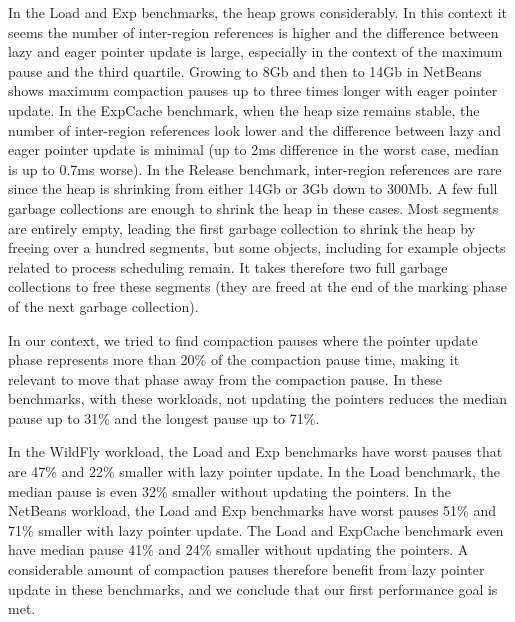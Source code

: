 \documentclass[sigplan,10pt,screen]{acmart}\settopmatter{printfolios=true,printccs=true,printacmref=true}
\newcommand{\egb}[1]{\color{blue}\fbox{\bfseries\sffamily\scriptsize Elisa:}{\sf\small$\blacktriangleright$\textit{#1}$\blacktriangleleft$}\color{black}}
\def\bestMedian{31\%\xspace}
\def\bestWorst{71\%\xspace}
\begin{document}
In the Load and Exp benchmarks, the heap grows considerably. In this context it seems the number of inter-region references is higher and the difference between lazy and eager pointer update is large, especially in the context of the maximum pause and the third quartile. Growing to 8Gb and then to 14Gb in NetBeans shows maximum compaction pauses up to three times longer with eager pointer update. In the ExpCache benchmark, when the heap size remains stable, the number of inter-region references look lower and the difference between lazy and eager pointer update is minimal (up to 2ms difference in the worst case, median is up to 0.7ms worse). In the Release benchmark, inter-region references are rare since the heap is shrinking from either 14Gb or 3Gb down to 300Mb. A few full garbage collections are enough to shrink the heap in these cases. Most segments are entirely empty, leading the first garbage collection to shrink the heap by freeing over a hundred segments, but some objects, including for example objects related to process scheduling remain. It takes therefore two full garbage collections to free these segments (they are freed at the end of the marking phase of the next garbage collection).

In our context, we tried to find compaction pauses where the pointer update phase represents more than 20\% of the compaction pause time, making it relevant to move that phase away from the compaction pause. In these benchmarks, with these workloads, not updating the pointers reduces the median pause up to \bestMedian and the longest pause up to \bestWorst. 

In the WildFly workload, the Load and Exp benchmarks have worst pauses that are 47\% and 22\% smaller with lazy pointer update. In the Load benchmark, the median pause is even 32\% smaller without updating the pointers. In the NetBeans workload, the Load and Exp benchmarks have worst pauses 51\% and 71\% smaller with lazy pointer update. The Load and ExpCache benchmark even have median pause 41\% and 24\% smaller without updating the pointers. A considerable amount of compaction pauses therefore benefit from lazy pointer update in these benchmarks, and we conclude that our first performance goal is met.
\end{document}
